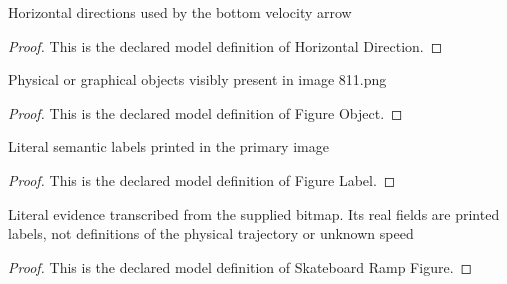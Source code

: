 \begin{definition}
  \label{def:physics:phyx-mini-0811:phyxminiproblems-problemphyxmini0811-horizontaldirection}
  Horizontal directions used by the bottom velocity arrow
\end{definition}
\begin{proof}
  This is the declared model definition of Horizontal Direction.
\end{proof}
\begin{definition}
  \label{def:physics:phyx-mini-0811:phyxminiproblems-problemphyxmini0811-figureobject}
  Physical or graphical objects visibly present in image 811.png
\end{definition}
\begin{proof}
  This is the declared model definition of Figure Object.
\end{proof}
\begin{definition}
  \label{def:physics:phyx-mini-0811:phyxminiproblems-problemphyxmini0811-figurelabel}
  Literal semantic labels printed in the primary image
\end{definition}
\begin{proof}
  This is the declared model definition of Figure Label.
\end{proof}
\begin{definition}
  \label{def:physics:phyx-mini-0811:phyxminiproblems-problemphyxmini0811-skateboardrampfigure}
  Literal evidence transcribed from the supplied bitmap. Its real fields are printed labels, not definitions of the physical trajectory or unknown speed
\end{definition}
\begin{proof}
  This is the declared model definition of Skateboard Ramp Figure.
\end{proof}
